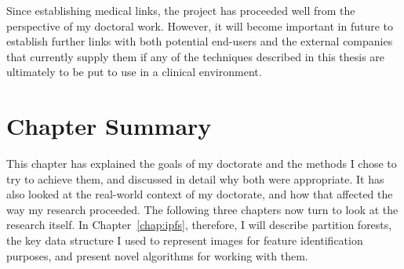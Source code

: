 Since establishing medical links, the project has proceeded well from the perspective of my doctoral work. However, it will become important in future to establish further links with both potential end-users and the external companies that currently supply them if any of the techniques described in this thesis are ultimately to be put to use in a clinical environment.


\section{Chapter Summary}

This chapter has explained the goals of my doctorate and the methods I chose to try to achieve them, and discussed in detail why both were appropriate. It has also looked at the real-world context of my doctorate, and how that affected the way my research proceeded. The following three chapters now turn to look at the research itself. In Chapter~\ref{chap:ipfs}, therefore, I will describe partition forests, the key data structure I used to represent images for feature identification purposes, and present novel algorithms for working with them.

